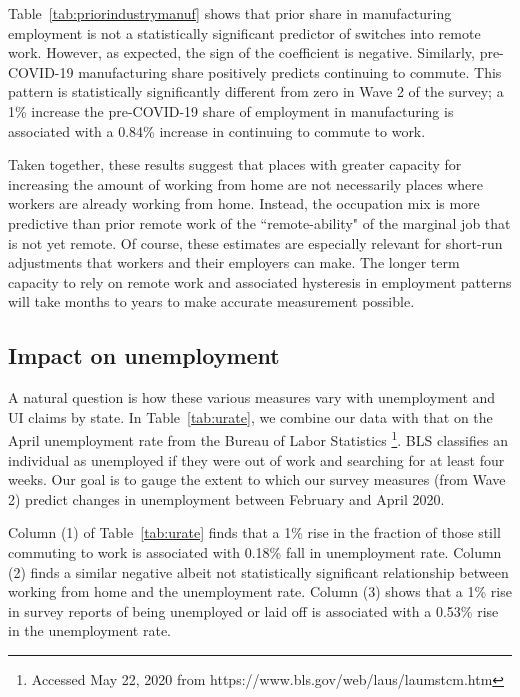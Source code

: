 \documentclass[12pt]{article}
\begin{document}
Table~\ref{tab:priorindustrymanuf} shows that prior share in manufacturing employment is not a statistically significant predictor of switches into remote work. However, as expected, the sign of the coefficient is negative. Similarly, pre-COVID-19 manufacturing share positively predicts continuing to commute. This pattern is statistically significantly different from zero in Wave 2 of the survey; a 1\% increase the pre-COVID-19 share of employment in manufacturing is associated with a 0.84\% increase in continuing to commute to work.



Taken together, these results suggest that places with greater capacity for increasing the amount of working from home are not necessarily places where workers are already working from home.  Instead, the occupation mix is more predictive than prior remote work of the ``remote-ability" of the marginal job that is not yet remote. Of course, these estimates are especially relevant for short-run adjustments that workers and their employers can make. The longer term capacity to rely on remote work and associated hysteresis in employment patterns will take months to years to make accurate measurement possible.

\subsection{Impact on unemployment} \label{sec:UI}

A natural question is how these various measures vary with unemployment and UI claims by state. In Table~\ref{tab:urate}, we combine our data with that on the April unemployment rate from the Bureau of Labor Statistics \footnote{Accessed May 22, 2020 from https://www.bls.gov/web/laus/laumstcm.htm}. BLS classifies an individual as unemployed if they were out of work and searching for at least four weeks. Our goal is to gauge the extent to which our survey measures (from Wave 2) predict changes in unemployment between February and April 2020. 

Column (1) of Table~\ref{tab:urate} finds that a 1\%  rise in the fraction of those still commuting to work is associated with 0.18\% fall in unemployment rate. Column (2) finds a similar negative albeit not statistically significant relationship between working from home and the unemployment rate. Column (3) shows that a 1\% rise in survey reports of being unemployed or laid off is associated with a 0.53\% rise in the unemployment rate.  
\end{document}
